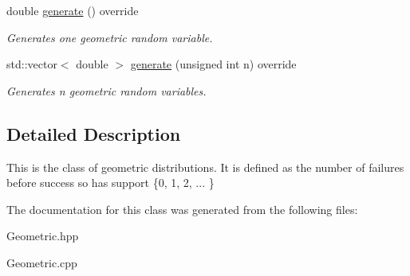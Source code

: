 \begin{DoxyCompactItemize}
\mbox{\label{classGeometric_afcbbbd4aebcd3962d724ed4c7483782b}} 
double \hyperlink{classGeometric_afcbbbd4aebcd3962d724ed4c7483782b}{generate} () override
\begin{DoxyCompactList}\small\item\em Generates one geometric random variable. \end{DoxyCompactList}\item 
\mbox{\label{classGeometric_a29ec0b4ff1d9a8aa7c26ddc7d480235c}} 
std\+::vector$<$ double $>$ \hyperlink{classGeometric_a29ec0b4ff1d9a8aa7c26ddc7d480235c}{generate} (unsigned int n) override
\begin{DoxyCompactList}\small\item\em Generates n geometric random variables. \end{DoxyCompactList}\end{DoxyCompactItemize}


\subsection{Detailed Description}
This is the class of geometric distributions. It is defined as the number of failures before success so has support \{0, 1, 2, ... \} 

The documentation for this class was generated from the following files\+:\begin{DoxyCompactItemize}
\item 
Geometric.\+hpp\item 
Geometric.\+cpp\end{DoxyCompactItemize}
